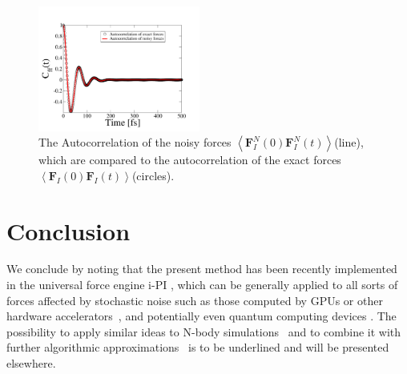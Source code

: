 \documentclass[format=acmsmall,urlbreakonhyphens]{acmart}
\begin{document}
\begin{figure}%
\begin{center}
\includegraphics[width=0.475\textwidth]
{figures/AutocorrelationPlot_n.pdf}
\end{center}
\caption{\label{Fig4}
The Autocorrelation of the noisy forces \(
\left \langle \textbf{F}_{I}^{N}\left ( 0 \right ) \textbf{F}_{I}^{N}\left ( t \right )\right \rangle \)(line), which are compared to the autocorrelation of the exact forces \( \left \langle \textbf{F}_{I}\left ( 0 \right ) \textbf{F}_{I}\left ( t \right )\right \rangle \)(circles).
} \end{figure}


\section{Conclusion}
\label{sec:conclusion}
We conclude by noting that the present method has been recently implemented in the universal force engine i-PI \cite{iPi}, which can be generally applied to all sorts of forces affected by stochastic noise such as those computed by GPUs or other hardware accelerators~\cite{HOOMD, NAMD, OpenMM, HalMD, Lammps, Amber, Gromacs}, and potentially even quantum computing devices \cite{Steane, Knill, Blatt, Chow}. The possibility to apply similar ideas to N-body simulations~\cite{White, Makino} and to combine it with further algorithmic approximations~\cite{LassAC} is to be underlined and will be presented elsewhere.
\end{document}
